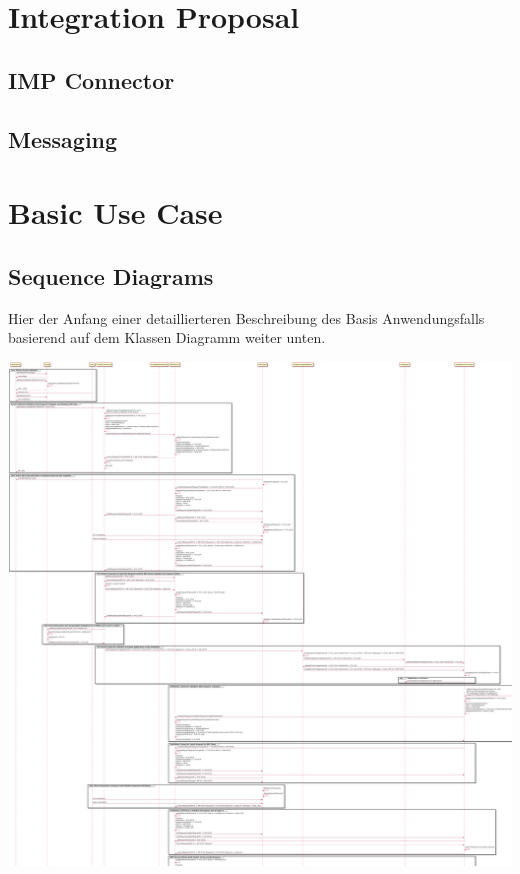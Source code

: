 \documentclass[
     12pt,         %
     a4paper,      %
     BCOR=10mm,version=first,     %
     DIV=14,version=first,        %
     ]{scrreprt}
\begin{document}
\section{Integration Proposal}

\subsection{IMP Connector}

\subsection{Messaging}

\section{Basic Use Case}

\subsection{Sequence Diagrams}

Hier der Anfang einer detaillierteren Beschreibung des Basis Anwendungsfalls basierend auf dem Klassen Diagramm weiter unten.

\includegraphics[width=15cm]{Diagrams/out/Sequence Diagram/Sequence Diagram.png}
\end{document}
